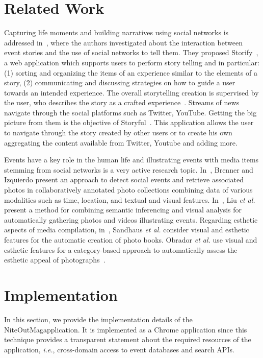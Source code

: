 \documentclass{acm_proc_article-sp}
\let\oldemph\emph
\renewcommand{\emph}[1]{\oldemph{\fontsize{9}{9}\selectfont #1}}
\begin{document}
{\section{Related Work}                                                      \label{sec:related-work}
Capturing life moments and building narratives using social networks is addressed in~\cite{Atosy2011}, where the authors investigated about the interaction between event stories and the use of social networks to tell them. They proposed Storify~\cite{Storify2012}, a web application which supports users to perform story telling and in particular: (1) sorting and organizing the items of an experience similar to the elements of a story, (2) communicating and discussing strategies on how to guide a user towards an intended experience. The overall storytelling creation is supervised by the user, who describes the story as a crafted experience~\cite{Hassenzahl2010}. Streams of news navigate through the social platforms such as Twitter, YouTube. Getting the big picture from them is the objective of Storyful~\cite{Storyful2012}. This application allows the user to navigate through the story created by other users or to create his own aggregating the content available from Twitter, Youtube and adding more.

Events have a key role in the human life and illustrating events with media items stemming from social networks is a very active research topic. In~\cite{Brenner2012}, Brenner and Izquierdo present an approach to detect social events and retrieve associated photos in collaboratively annotated photo collections combining data of various modalities such as time, location, and textual and visual features. In~\cite{Liu2011}, Liu \emph{et al.} present a method for combining semantic inferencing and visual analysis for automatically gathering photos and videos illustrating events. Regarding esthetic aspects of media compilation, in~\cite{Sandhaus2011}, Sandhaus \emph{et al.} consider visual and esthetic features for the automatic creation of photo books. Obrador \emph{et al.} use visual and esthetic features for a category-based approach to automatically assess the esthetic appeal of photographs~\cite{Obrador2012}.


\section{Implementation}                                                    \label{sec:implementation}
In this section, we provide the implementation details of the NiteOutMag\texttrademark application. It is implemented as a Chrome application since this technique provides a transparent statement about the required resources of the application, \emph{i.e.}, cross-domain access to event databases and search APIs.

}
\end{document}
